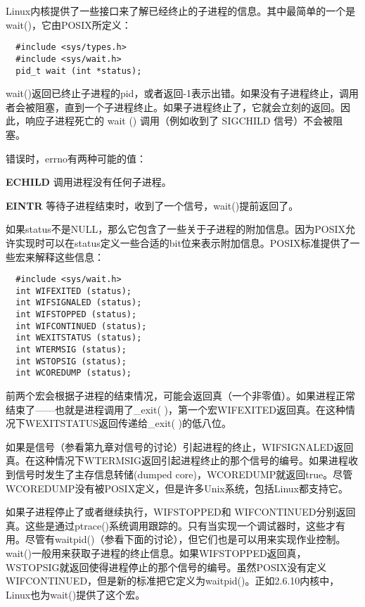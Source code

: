 Linux内核提供了一些接口来了解已经终止的子进程的信息。其中最简单的一个是wait()，它由POSIX所定义：

\begin{lstlisting}
  #include <sys/types.h>
  #include <sys/wait.h>
  pid_t wait (int *status);
\end{lstlisting}

wait()返回已终止子进程的pid，或者返回-1表示出错。如果没有子进程终止，调用者会被阻塞，直到一个子进程终止。如果子进程终止了，它就会立刻的返回。因此，响应子进程死亡的 wait () 调用（例如收到了 SIGCHILD 信号）不会被阻塞。

错误时，errno有两种可能的值：

\begin{eqlist*}
\item[\textbf{ECHILD}] 调用进程没有任何子进程。
\item[\textbf{EINTR}] 等待子进程结束时，收到了一个信号，wait()提前返回了。
\end{eqlist*}

如果status不是NULL，那么它包含了一些关于子进程的附加信息。因为POSIX允许实现时可以在status定义一些合适的bit位来表示附加信息。POSIX标准提供了一些宏来解释这些信息：

\begin{lstlisting}
  #include <sys/wait.h>
  int WIFEXITED (status);
  int WIFSIGNALED (status);
  int WIFSTOPPED (status);
  int WIFCONTINUED (status);
  int WEXITSTATUS (status);
  int WTERMSIG (status);
  int WSTOPSIG (status);
  int WCOREDUMP (status);
\end{lstlisting}

前两个宏会根据子进程的结束情况，可能会返回真（一个非零值）。如果进程正常结束了——也就是进程调用了\_exit( )，第一个宏WIFEXITED返回真。在这种情况下WEXITSTATUS返回传递给\_exit( )的低八位。

如果是信号（参看第九章对信号的讨论）引起进程的终止，WIFSIGNALED返回真。在这种情况下WTERMSIG返回引起进程终止的那个信号的编号。如果进程收到信号时发生了主存信息转储(dumped core)，WCOREDUMP就返回true。尽管WCOREDUMP没有被POSIX定义，但是许多Unix系统，包括Linux都支持它。

如果子进程停止了或者继续执行，WIFSTOPPED和 WIFCONTINUED分别返回真。这些是通过ptrace()系统调用跟踪的。只有当实现一个调试器时，这些才有用。尽管有waitpid()（参看下面的讨论），但它们也是可以用来实现作业控制。wait()一般用来获取子进程的终止信息。如果WIFSTOPPED返回真，WSTOPSIG就返回使得进程停止的那个信号的编号。虽然POSIX没有定义WIFCONTINUED，但是新的标准把它定义为waitpid()。正如2.6.10内核中，Linux也为wait()提供了这个宏。

